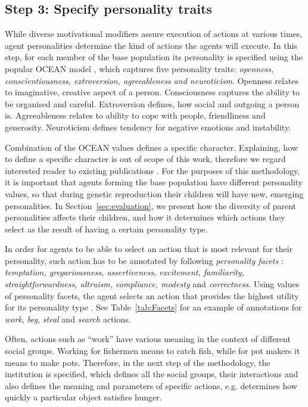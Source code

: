 \subsection{Step 3: Specify personality traits}
\label{subSec:personalityTraits}

\label{sec:step3}

While diverse motivational modifiers assure execution of actions at various times, agent personalities determine the kind of actions the agents will execute.  In this step, for each member of the base population its personality is specified using the popular OCEAN model \cite{OCEAN}, which captures five personality traits: \textit{openness, conscientiousness, extroversion, agreeableness and neuroticism}. Openness relates to imaginative, creative aspect of a person. Consciousness captures the ability to be organised and careful. Extroversion defines, how social and outgoing a person is. Agreeableness relates to ability to cope with people, friendliness and generosity. Neuroticism defines tendency for negative emotions and instability. 

Combination of the OCEAN values defines a specific character. Explaining, how to define a specific character is out of scope of this work, therefore we regard interested reader to existing publications \cite{bartneck2002} \cite{Steunebrink_Dastani_Meyer_2009}. For the purposes of this methodology, it is important that agents forming the base population have different personality values, so that during genetic reproduction their children will have new, emerging personalities. In Section~\ref{sec:evaluation}, we present how the diversity of parent personalities affects their children, and how it determines which actions they select as the result of having a certain personality type. 

In order for agents to be able to select an action that is most relevant for their personality, such action has to be annotated by following \textit{personality facets} \cite{howard1995}: \textit{temptation, gregariousness, assertiveness, excitement, familiarity, straightforwardness, altruism, compliance, modesty} and \textit{correctness}. Using values of personality facets, the agent selects an action that provides the highest utility for its personality type \cite{bartneck2002} \cite{howard1995}. See Table~\ref{tab:Facets} for an example of annotations for \emph{work}, \emph{beg}, \emph{steal} and \emph{search} actions.

Often, actions such as ``work'' have various meaning in the context of different social groups. Working for fishermen means to catch fish, while for pot makers it means to make pots. Therefore, in the next step of the methodology, the institution is specified, which defines all the social groups, their interactions and also defines the meaning and parameters of specific actions, e.g. determines how quickly a particular object satisfies hunger.


